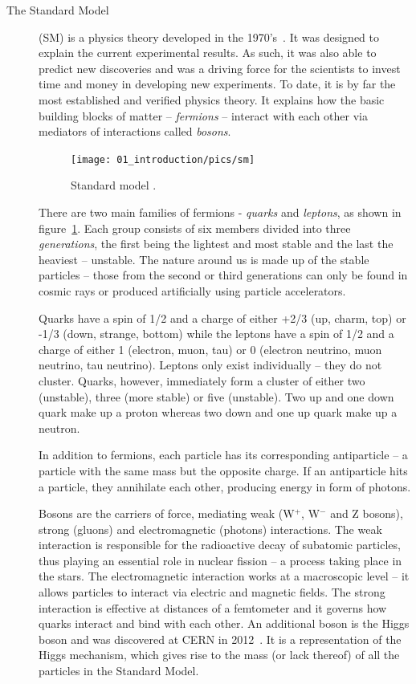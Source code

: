 \begin{description}
\item[The Standard Model]
(SM) is a physics theory developed in the 1970's~\cite{Novaes:1999yn}. It was designed to explain the current experimental results. As such, it was also able to predict new discoveries and was a driving force for the scientists to invest time and money in developing new experiments. To date, it is by far the most established and verified physics theory. It explains how the basic building blocks of matter -- \emph{fermions} -- interact with each other via mediators of interactions called \emph{bosons}.  
\begin{figure}[!t]
\centering
\texttt{[image: 01\_introduction/pics/sm]}
\caption{Standard model \cite{Dominguez:2002395}.}
\label{fig:sm}
\end{figure}
There are two main families of fermions - \emph{quarks} and \emph{leptons}, as shown in figure~\ref{fig:sm}. Each group consists of six members divided into three \emph{generations}, the first being the lightest and most stable and the last the heaviest -- unstable. The nature around us is made up of the stable particles -- those from the second or third generations can only be found in cosmic rays or produced artificially using particle accelerators.

Quarks have a spin of 1/2 and a charge of either +2/3 (up, charm, top)  or -1/3  (down, strange, bottom) while the leptons have a spin of 1/2  and a charge of either 1 (electron, muon, tau) or 0 (electron neutrino, muon neutrino, tau neutrino). Leptons only exist individually -- they do not cluster. Quarks, however, immediately form a cluster of either two (unstable), three (more stable) or five (unstable). Two up and one down quark make up a proton whereas two down and one up quark make up a neutron.

In addition to fermions, each particle has its corresponding antiparticle -- a particle with the same mass but the opposite charge. If an antiparticle hits a particle, they annihilate each other, producing energy in form of photons. 

Bosons are the carriers of force, mediating weak (W$^+$, W$^-$ and Z bosons), strong (gluons) and electromagnetic (photons) interactions. The weak interaction is responsible for the radioactive decay of subatomic particles, thus playing an essential role in nuclear fission -- a process taking place in the stars. The electromagnetic interaction works at a macroscopic level -- it allows particles to interact via electric and magnetic fields. The strong interaction is effective at distances of a femtometer and it governs how quarks interact and bind with each other. An additional boson is the Higgs boson and was discovered at CERN in 2012~\cite{}. It is a representation of the Higgs mechanism, which gives rise to the mass (or lack thereof) of all the particles in the Standard Model.
\end{description}

